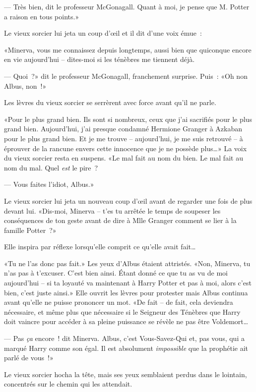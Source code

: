 --- Très bien, dit le professeur McGonagall. Quant à moi, je pense que M. Potter a raison en tous points.»

Le vieux sorcier lui jeta un coup d'œil et il dit d'une voix émue~:

«Minerva, vous me connaissez depuis longtemps, aussi bien que quiconque encore en vie aujourd'hui -- dites-moi si les ténèbres me tiennent déjà.

--- Quoi~?» dit le professeur McGonagall, franchement surprise. Puis~: «Oh non Albus, non~!»

Les lèvres du vieux sorcier se serrèrent avec force avant qu'il ne parle.

«Pour le plus grand bien. Ils sont si nombreux, ceux que j'ai sacrifiés pour le plus grand bien. Aujourd'hui, j'ai presque condamné Hermione Granger à Azkaban pour le plus grand bien. Et je me trouve -- aujourd'hui, je me suis retrouvé -- à éprouver de la rancune envers cette innocence que je ne possède plus…» La voix du vieux sorcier resta en suspens. «Le mal fait au nom du bien. Le mal fait au nom du mal. Quel \emph{est} le pire~?

--- Vous faites l'idiot, Albus.»

Le vieux sorcier lui jeta un nouveau coup d'œil avant de regarder une fois de plus devant lui. «Dis-moi, Minerva -- t'es tu arrêtée le temps de soupeser les conséquences de ton geste avant de dire à Mlle Granger comment se lier à la famille Potter~?»

Elle inspira par réflexe lorsqu'elle comprit ce qu'elle avait fait…

«Tu ne l'as donc pas fait.» Les yeux d'Albus étaient attristés. «Non, Minerva, tu n'as pas à t'excuser. C'est bien ainsi. Étant donné ce que tu as vu de moi aujourd'hui -- si ta loyauté va maintenant à Harry Potter et pas à moi, alors c'est bien, c'est juste ainsi.» Elle ouvrit les lèvres pour protester mais Albus continua avant qu'elle ne puisse prononcer un mot. «De fait -- de fait, cela deviendra nécessaire, et même plus que nécessaire si le Seigneur des Ténèbres que Harry doit vaincre pour accéder à sa pleine puissance se révèle ne pas être Voldemort…

--- Pas \emph{ça} encore~! dit Minerva. Albus, c'est Vous-Savez-Qui et, pas vous, qui a marqué Harry comme son égal. Il est absolument \emph{impossible} que la prophétie ait parlé de vous~!»

Le vieux sorcier hocha la tête, mais ses yeux semblaient perdus dans le lointain, concentrés sur le chemin qui les attendait.

